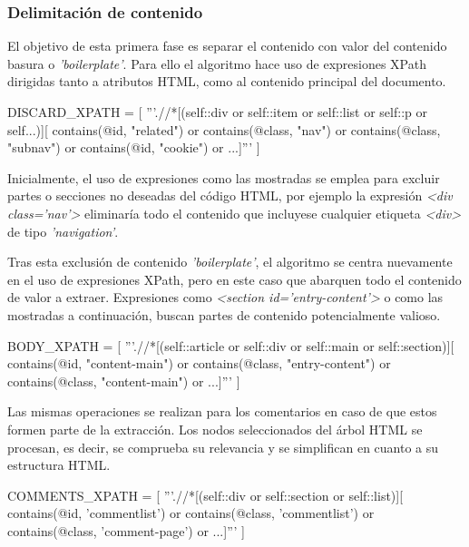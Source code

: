 \subsubsection{Delimitación de contenido}
\label{subsubsec:delimitacion de contenido}

El objetivo de esta primera fase es separar el contenido con valor del contenido basura o
\emph{'boilerplate'}. Para ello el algoritmo hace uso de expresiones XPath dirigidas tanto a atributos HTML,
como al contenido principal del documento.

\begin{Schunk}
  \begin{Soutput}
    DISCARD_XPATH = [
      '''.//*[(self::div or self::item or self::list or self::p or self...)][
      contains(@id, "related") or contains(@class, "nav") or 
      contains(@class, "subnav") or contains(@id, "cookie") or ...]'''
    ]
  \end{Soutput}
\end{Schunk}

Inicialmente, el uso de expresiones como las mostradas se emplea para excluir partes o secciones no deseadas 
del código HTML, por ejemplo la expresión \emph{<div class='nav'>} eliminaría todo el contenido que incluyese
cualquier etiqueta \emph{<div>} de tipo \emph{'navigation'}.

Tras esta exclusión de contenido \emph{'boilerplate'}, el algoritmo se centra nuevamente en el uso de 
expresiones XPath, pero en este caso que abarquen todo el contenido de valor a extraer. Expresiones como
\emph{<section id='entry-content'>} o como las mostradas a continuación, buscan partes de contenido
potencialmente valioso.

\begin{Schunk}
  \begin{Soutput}
    BODY_XPATH = [
      '''.//*[(self::article or self::div or self::main or self::section)][
      contains(@id, "content-main") or
      contains(@class, "entry-content") or 
      contains(@class, "content-main") or ...]'''
    ]
  \end{Soutput}
\end{Schunk}

Las mismas operaciones se realizan para los comentarios en caso de que estos formen parte de la extracción. 
Los nodos seleccionados del árbol HTML se procesan, es decir, se comprueba su relevancia y se simplifican 
en cuanto a su estructura HTML.

\begin{Schunk}
  \begin{Soutput}
    COMMENTS_XPATH = [
      '''.//*[(self::div or self::section or self::list)][
      contains(@id, 'commentlist') or 
      contains(@class, 'commentlist') or 
      contains(@class, 'comment-page') or ...]'''
    ]
  \end{Soutput}
\end{Schunk}

